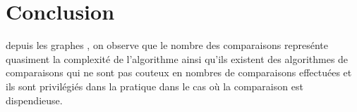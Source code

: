 \section{Conclusion}
depuis les graphes , on observe que le nombre des comparaisons represénte quasiment la complexité de l'algorithme ainsi qu'ils existent des algorithmes de comparaisons qui ne sont pas couteux en nombres de comparaisons effectuées et ils sont privilégiés dans la pratique dans le cas où la comparaison est dispendieuse.

